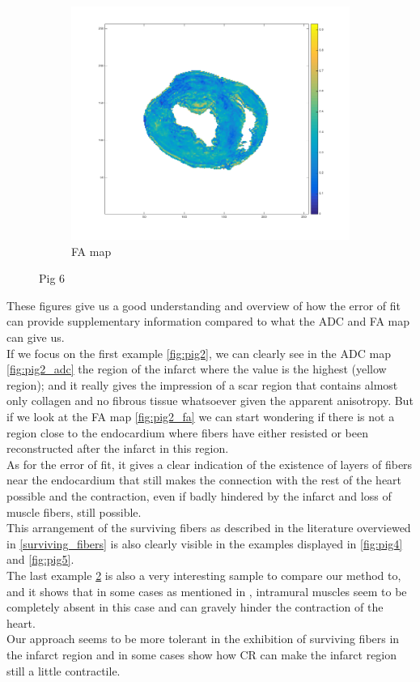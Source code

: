\begin{figure}[h!]
\begin{subfigure}{.31\textwidth}
        \includegraphics[width=\textwidth]{figures/pig6_fa_24}
        \caption{FA map}
        \label{fig:pig6_fa}
    \end{subfigure}
    \caption{Pig 6}
    \label{fig:pig6}
\end{figure}

These figures give us a good understanding and overview of how the error of fit can provide supplementary information compared to what the ADC and FA map can give us.\\
If we focus on the first example \ref{fig:pig2}, we can clearly see in the ADC map \ref{fig:pig2_adc} the region of the infarct where the value is the highest (yellow region); and it really gives the impression of a scar region that contains almost only collagen and no fibrous tissue whatsoever given the apparent anisotropy. But if we look at the FA map \ref{fig:pig2_fa} we can start wondering if there is not a region close to the endocardium where fibers have either resisted or been reconstructed after the infarct in this region.\\
As for the error of fit, it gives a clear indication of the existence of layers of fibers near the endocardium that still makes the connection with the rest of the heart possible and the contraction, even if badly hindered by the infarct and loss of muscle fibers, still possible.\\
This arrangement of the surviving fibers as described in the literature overviewed in \ref{surviving_fibers} is also clearly visible in the examples displayed in \ref{fig:pig4} and \ref{fig:pig5}.\\
The last example \ref{fig:pig6} is also a very interesting sample to compare our method to, and it shows that in some cases as mentioned in \cite{ursell1985structural}, intramural muscles seem to be completely absent in this case and can gravely hinder the contraction of the heart.\\
Our approach seems to be more tolerant in the exhibition of surviving fibers in the infarct region and in some cases show how CR can make the infarct region still a little contractile.

